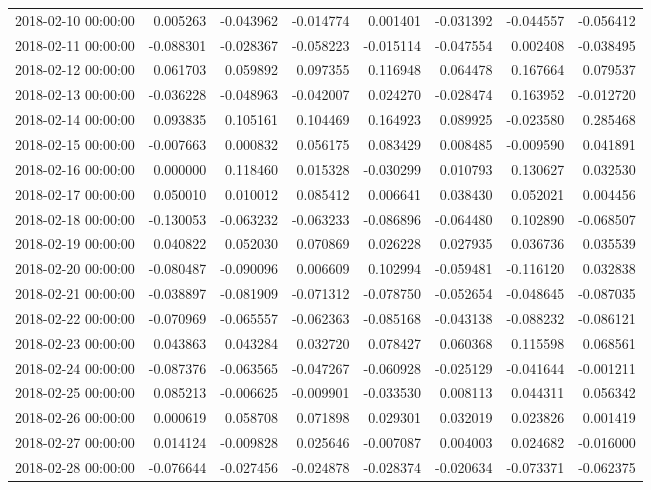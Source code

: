 \begin{tabular}{lrrrrrrr}
2018-02-10 00:00:00 & 0.005263 & -0.043962 & -0.014774 & 0.001401 & -0.031392 & -0.044557 & -0.056412 \\
2018-02-11 00:00:00 & -0.088301 & -0.028367 & -0.058223 & -0.015114 & -0.047554 & 0.002408 & -0.038495 \\
2018-02-12 00:00:00 & 0.061703 & 0.059892 & 0.097355 & 0.116948 & 0.064478 & 0.167664 & 0.079537 \\
2018-02-13 00:00:00 & -0.036228 & -0.048963 & -0.042007 & 0.024270 & -0.028474 & 0.163952 & -0.012720 \\
2018-02-14 00:00:00 & 0.093835 & 0.105161 & 0.104469 & 0.164923 & 0.089925 & -0.023580 & 0.285468 \\
2018-02-15 00:00:00 & -0.007663 & 0.000832 & 0.056175 & 0.083429 & 0.008485 & -0.009590 & 0.041891 \\
2018-02-16 00:00:00 & 0.000000 & 0.118460 & 0.015328 & -0.030299 & 0.010793 & 0.130627 & 0.032530 \\
2018-02-17 00:00:00 & 0.050010 & 0.010012 & 0.085412 & 0.006641 & 0.038430 & 0.052021 & 0.004456 \\
2018-02-18 00:00:00 & -0.130053 & -0.063232 & -0.063233 & -0.086896 & -0.064480 & 0.102890 & -0.068507 \\
2018-02-19 00:00:00 & 0.040822 & 0.052030 & 0.070869 & 0.026228 & 0.027935 & 0.036736 & 0.035539 \\
2018-02-20 00:00:00 & -0.080487 & -0.090096 & 0.006609 & 0.102994 & -0.059481 & -0.116120 & 0.032838 \\
2018-02-21 00:00:00 & -0.038897 & -0.081909 & -0.071312 & -0.078750 & -0.052654 & -0.048645 & -0.087035 \\
2018-02-22 00:00:00 & -0.070969 & -0.065557 & -0.062363 & -0.085168 & -0.043138 & -0.088232 & -0.086121 \\
2018-02-23 00:00:00 & 0.043863 & 0.043284 & 0.032720 & 0.078427 & 0.060368 & 0.115598 & 0.068561 \\
2018-02-24 00:00:00 & -0.087376 & -0.063565 & -0.047267 & -0.060928 & -0.025129 & -0.041644 & -0.001211 \\
2018-02-25 00:00:00 & 0.085213 & -0.006625 & -0.009901 & -0.033530 & 0.008113 & 0.044311 & 0.056342 \\
2018-02-26 00:00:00 & 0.000619 & 0.058708 & 0.071898 & 0.029301 & 0.032019 & 0.023826 & 0.001419 \\
2018-02-27 00:00:00 & 0.014124 & -0.009828 & 0.025646 & -0.007087 & 0.004003 & 0.024682 & -0.016000 \\
2018-02-28 00:00:00 & -0.076644 & -0.027456 & -0.024878 & -0.028374 & -0.020634 & -0.073371 & -0.062375 \\

\end{tabular}
